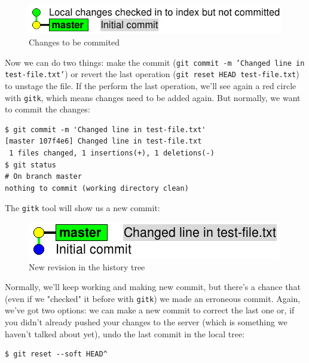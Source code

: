\documentclass[a4paper,10pt]{article}
\newenvironment{terminal}
  {
    \vspace{+10pt}
    \begin{center}
    \begin{minipage}{0.95\textwidth}
    \begin{framed}
  }
  {
    \end{framed}
    \end{minipage}
    \end{center}
    \vspace{+10pt}
  }
\begin{document}
\begin{figure}[h]
  \begin{center}
    \includegraphics[scale=0.5]{git_example-02}
  \end{center}
  \caption{Changes to be commited}
\end{figure}

Now we can do two things: make the commit (\texttt{git commit -m
'Changed line in test-file.txt'}) or revert the last operation
(\texttt{git reset HEAD test-file.txt}) to unstage the file. If the
perform the last operation, we'll see again a red circle with
\texttt{gitk}, which means changes need to be added again. But normally,
we want to commit the changes:

\begin{terminal}
\begin{verbatim}
$ git commit -m 'Changed line in test-file.txt'
[master 107f4e6] Changed line in test-file.txt
 1 files changed, 1 insertions(+), 1 deletions(-)
$ git status
# On branch master
nothing to commit (working directory clean)
\end{verbatim}
\end{terminal}

The \texttt{gitk} tool will show us a new commit:

\begin{figure}[h]
  \begin{center}
    \includegraphics[scale=0.5]{git_example-03}
  \end{center}
  \caption{New revision in the history tree}
\end{figure}

Normally, we'll keep working and making new commit, but there's a
chance that (even if we "checked" it before with \texttt{gitk}) we
made an erroneous commit. Again, we've got two options: we can make
a new commit to correct the last one or, if you didn't already pushed
your changes to the server (which is something we haven't talked about
yet), undo the last commit in the local tree:

\begin{terminal}
\begin{verbatim}
$ git reset --soft HEAD^
\end{verbatim}
\end{terminal}
\end{document}
